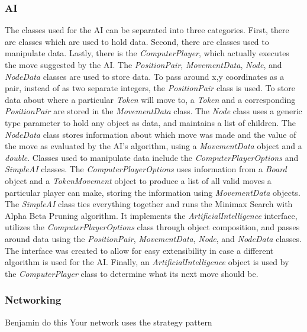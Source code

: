 \documentclass{article}
\begin{document}
\subsubsection{AI}
	The classes used for the AI can be separated into three categories. First, there are classes which are used to hold data. Second, there are classes used to manipulate data. Lastly, there is the \textit{ComputerPlayer}, which actually executes the move suggested by the AI.  
	The \textit{PositionPair}, \textit{MovementData}, \textit{Node}, and \textit{NodeData} classes are used to store data. To pass around x,y coordinates as a pair, instead of as two separate integers, the \textit{PositionPair} class is used. To store data about where a particular \textit{Token} will move to, a \textit{Token} and a corresponding \textit{PositionPair} are stored in the \textit{MovementData} class. The \textit{Node} class uses a generic type parameter to hold any object as data, and maintains a list of children. The \textit{NodeData} class stores information about which move was made and the value of the move as evaluated by the AI's algorithm, using a \textit{MovementData} object and a \textit{double}.
	Classes used to manipulate data include the \textit{ComputerPlayerOptions} and \textit{SimpleAI} classes. The \textit{ComputerPlayerOptions} uses information from a \textit{Board} object and a \textit{TokenMovement} object to produce a list of all valid moves a particular player can make, storing the information using \textit{MovementData} objects. The \textit{SimpleAI} class ties everything together and runs the Minimax Search with Alpha Beta Pruning algorithm. It implements the \textit{ArtificialIntelligence} interface, utilizes the \textit{ComputerPlayerOptions} class through object composition, and passes around data using the \textit{PositionPair}, \textit{MovementData}, \textit{Node}, and \textit{NodeData} classes. The interface was created to allow for easy extensibility in case a different algorithm is used for the AI.
	Finally, an \textit{ArtificialIntelligence} object is used by the \textit{ComputerPlayer} class to determine what its next move should be. 

\subsubsection{Networking}
Benjamin do this
Your network uses the strategy pattern
\end{document}
